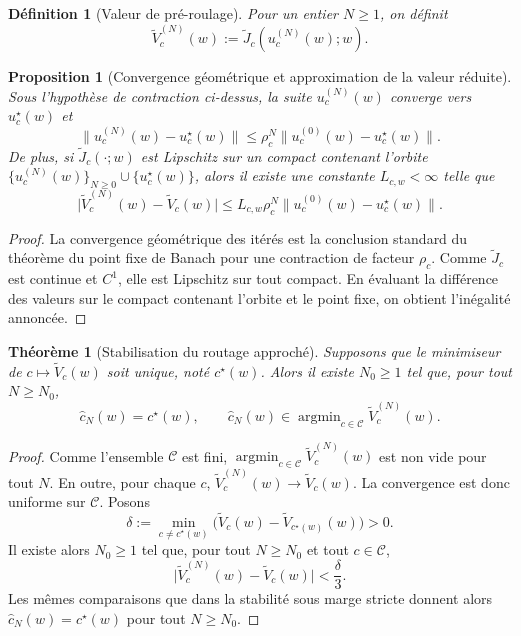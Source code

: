 \documentclass[11pt,a4paper]{article}
\newtheorem{definition}{Définition}[section]
\newtheorem{proposition}{Proposition}[section]
\newtheorem{theorem}{Théorème}[section]
\DeclareMathOperator{\argmin}{argmin}
\newcommand{\Ccal}{\mathcal C}
\begin{document}
\begin{definition}[Valeur de pré-roulage]
Pour un entier \(N\ge 1\), on définit
\[
\widetilde V_c^{(N)}(w):=\widetilde J_c(u_c^{(N)}(w);w).
\]
\end{definition}

\begin{proposition}[Convergence géométrique et approximation de la valeur réduite]
Sous l'hypothèse de contraction ci-dessus, la suite \(u_c^{(N)}(w)\) converge vers \(u_c^\star(w)\) et
\[
\|u_c^{(N)}(w)-u_c^\star(w)\|\le \rho_c^N\|u_c^{(0)}(w)-u_c^\star(w)\|.
\]
De plus, si \(\widetilde J_c(\cdot;w)\) est Lipschitz sur un compact contenant l'orbite \(\{u_c^{(N)}(w)\}_{N\ge 0}\cup\{u_c^\star(w)\}\), alors il existe une constante \(L_{c,w}<\infty\) telle que
\[
\bigl|\widetilde V_c^{(N)}(w)-\widetilde V_c(w)\bigr|\le L_{c,w}\rho_c^N\|u_c^{(0)}(w)-u_c^\star(w)\|.
\]
\end{proposition}

\begin{proof}
La convergence géométrique des itérés est la conclusion standard du théorème du point fixe de Banach pour une contraction de facteur \(\rho_c\). Comme \(\widetilde J_c\) est continue et \(C^1\), elle est Lipschitz sur tout compact. En évaluant la différence des valeurs sur le compact contenant l'orbite et le point fixe, on obtient l'inégalité annoncée.
\end{proof}

\begin{theorem}[Stabilisation du routage approché]
Supposons que le minimiseur de \(c\mapsto \widetilde V_c(w)\) soit unique, noté \(c^\star(w)\). Alors il existe \(N_0\ge 1\) tel que, pour tout \(N\ge N_0\),
\[
\hat c_N(w)=c^\star(w),
\qquad
\hat c_N(w)\in\argmin_{c\in\Ccal}\widetilde V_c^{(N)}(w).
\]
\end{theorem}

\begin{proof}
Comme l'ensemble \(\Ccal\) est fini, \(\argmin_{c\in\Ccal}\widetilde V_c^{(N)}(w)\) est non vide pour tout \(N\). En outre, pour chaque \(c\), \(\widetilde V_c^{(N)}(w)\to \widetilde V_c(w)\). La convergence est donc uniforme sur \(\Ccal\). Posons
\[
\delta:=\min_{c\neq c^\star(w)}\bigl(\widetilde V_c(w)-\widetilde V_{c^\star(w)}(w)\bigr)>0.
\]
Il existe alors \(N_0\ge 1\) tel que, pour tout \(N\ge N_0\) et tout \(c\in\Ccal\),
\[
\bigl|\widetilde V_c^{(N)}(w)-\widetilde V_c(w)\bigr|<\frac{\delta}{3}.
\]
Les mêmes comparaisons que dans la stabilité sous marge stricte donnent alors \(\hat c_N(w)=c^\star(w)\) pour tout \(N\ge N_0\).
\end{proof}
\end{document}

